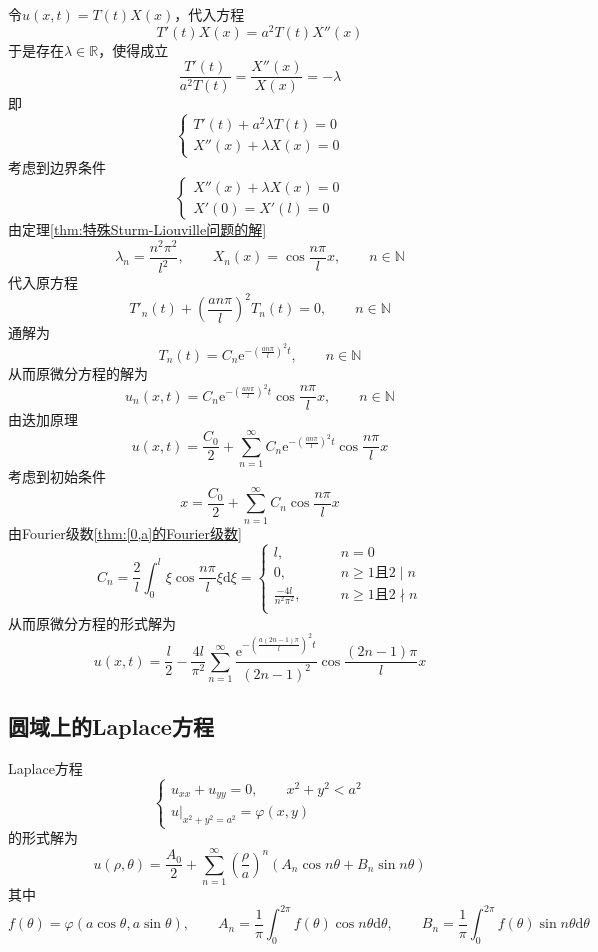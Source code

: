 \documentclass[lang = cn, scheme = chinese, thmcnt = section]{elegantbook}
\newcommand{\N}{\mathbb{N}}            %
\newcommand{\R}{\mathbb{R}}            %
\newcommand{\dd}{\mathrm{d}}           %
\newcommand{\ee}[1]{\mathrm{e}^{#1}}   %
\begin{document}
\begin{solution}
	令$u(x,t)=T(t)X(x)$，代入方程
	$$
	T'(t)X(x)=a^2T(t)X''(x)
	$$
	于是存在$\lambda\in\R$，使得成立
	$$
	\frac{T'(t)}{a^2T(t)}
	=\frac{X''(x)}{X(x)}
	=-\lambda
	$$
	即%
	$$
	\begin{cases}
		T'(t)+a^2\lambda T(t)=0\\
		X''(x)+\lambda X(x)=0
	\end{cases}
	$$
	考虑到边界条件
	$$
	\begin{cases}
		X''(x)+\lambda X(x)=0\\
		X'(0)=X'(l)=0
	\end{cases}
	$$
	由定理\ref{thm:特殊Sturm-Liouville问题的解}%
	$$
	\lambda_n=\frac{n^2\pi^2}{l^2},\qquad 
	X_n(x)=\cos\frac{n\pi}{l}x,\qquad n\in\N
	$$
	代入原方程
	$$
	T'_n(t)+\left(\frac{an\pi}{l}\right)^2T_n(t)=0,\qquad n\in\N
	$$
	通解为
	$$
	T_n(t)=C_n\ee{-\left(\frac{an\pi}{l}\right)^2t},\qquad n\in\N
	$$
	从而原微分方程的解为
	$$
	u_n(x,t)
	=C_n\ee{-\left(\frac{an\pi}{l}\right)^2t}\cos\frac{n\pi}{l}x,\qquad 
	n\in\N
	$$
	由迭加原理
	$$
	u(x,t)=\frac{C_0}{2}+\sum_{n=1}^{\infty}C_n\ee{-\left(\frac{an\pi}{l}\right)^2t}\cos\frac{n\pi}{l}x
	$$
	考虑到初始条件
	$$
	x=\frac{C_0}{2}+\sum_{n=1}^{\infty}C_n\cos\frac{n\pi}{l}x
	$$
	由Fourier级数\ref{thm:[0,a]的Fourier级数}
	$$
	C_n=\frac{2}{l}\int_0^l\xi\cos\frac{n\pi }{l}\xi\dd \xi=\begin{cases}
		l,\qquad & n=0\\
		0,\qquad & n\ge 1\text{且}2\mid n\\
		\frac{-4l}{n^2\pi^2},\qquad & n\ge 1\text{且}2\nmid n\\
	\end{cases}
	$$
	从而原微分方程的形式解为
	$$
	u(x,t)=\frac{l}{2}-\frac{4l}{\pi^2}\sum_{n=1}^{\infty}\frac{\mathrm{e}^{-\left(\frac{a(2n-1)\pi}{l}\right)^2t}}{(2n-1)^2}\cos\frac{(2n-1)\pi}{l}x
	$$
\end{solution}

\subsection{圆域上的Laplace方程}

\begin{proposition}
	Laplace方程%
	$$
	\begin{cases}
		u_{xx}+u_{yy}=0,\qquad x^2+y^2<a^2\\
		u|_{x^2+y^2=a^2}=\varphi(x,y)
	\end{cases}
	$$
	的形式解为%
	$$
	u(\rho,\theta)= \frac{A_0}{2}+\sum_{n=1}^{\infty}\left(\frac{\rho}{a}\right)^n\left(A_n\cos n\theta+B_n\sin n\theta\right)
	$$
	其中
	$$
	f(\theta)=\varphi(a\cos\theta,a\sin\theta),\qquad 
	A_n=\frac{1}{\pi}\int_{0}^{2\pi}f(\theta)\cos n \theta\dd \theta,\qquad 
	B_n=\frac{1}{\pi}\int_{0}^{2\pi}f(\theta)\sin n \theta\dd \theta
	$$
\end{proposition}
\end{document}
